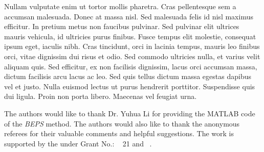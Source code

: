 Nullam vulputate enim ut tortor mollis pharetra. Cras pellentesque sem a accumsan malesuada. Donec at massa nisl. Sed malesuada felis id nisl maximus efficitur. In pretium metus non faucibus pulvinar. Sed pulvinar elit ultrices mauris vehicula, id ultricies purus finibus. Fusce tempus elit molestie, consequat ipsum eget, iaculis nibh. Cras tincidunt, orci in lacinia tempus, mauris leo finibus orci, vitae dignissim dui risus et odio. Sed commodo ultricies nulla, et varius velit aliquam quis. Sed efficitur, ex non facilisis dignissim, lacus orci accumsan massa, dictum facilisis arcu lacus ac leo. Sed quis tellus dictum massa egestas dapibus vel et justo. Nulla euismod lectus ut purus hendrerit porttitor. Suspendisse quis dui ligula. Proin non porta libero. Maecenas vel feugiat urna.

\begin{acks}
The authors would like to thank Dr. Yuhua Li for providing the MATLAB code of the \textit{BEPS} method.
The authors would also like to thank the anonymous referees for their valuable comments and helpful suggestions. The work is supported by the  under Grant No.: ~
21 and ~.
\end{acks}